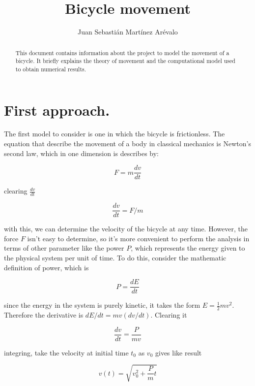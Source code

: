 \documentclass{article}
\title{Bicycle movement}
\author{Juan Sebasti\'{a}n Mart\'{i}nez Ar\'{e}valo}
\begin{document}
\maketitle

\begin{abstract}
This document contains information about the project to model the movement of a bicycle. It briefly explains the theory of movement and the computational model used to obtain numerical results.
\end{abstract}

\section{First approach.}

The first model to consider is one in which the bicycle is frictionless. The equation that describe the movement of a body in classical mechanics is Newton's second law, which in one dimension is describes by:

\begin{equation}
  F = m\frac{dv}{dt}
\end{equation}

clearing $\frac{dv}{dt}$

\begin{equation}
  \frac{dv}{dt} = F/m
  \label{NSL}
\end{equation}

with this, we can determine the velocity of the bicycle at any time. However,  the force $F$ isn't easy to determine, so it's more convenient to perform the analysis in terms of other parameter like the power $P$, which represents the energy given to the physical system per unit of time. To do this, consider the mathematic definition of power, which is

\begin{equation}
  P = \frac{dE}{dt}
\end{equation}

since the energy in the system is purely kinetic, it takes the form $E=\frac{1}{2}mv^{2}$. Therefore the derivative is $dE/dt = mv(dv/dt)$. Clearing it

\begin{equation}
  \frac{dv}{dt} = \frac{P}{mv}
\end{equation}

integring, take the velocity at initial time $t_0$ as $v_0$ gives like result

\begin{equation}
  v(t) = \sqrt{v_0^2 + \frac{P}{m}t}
\end{equation}
\end{document}
